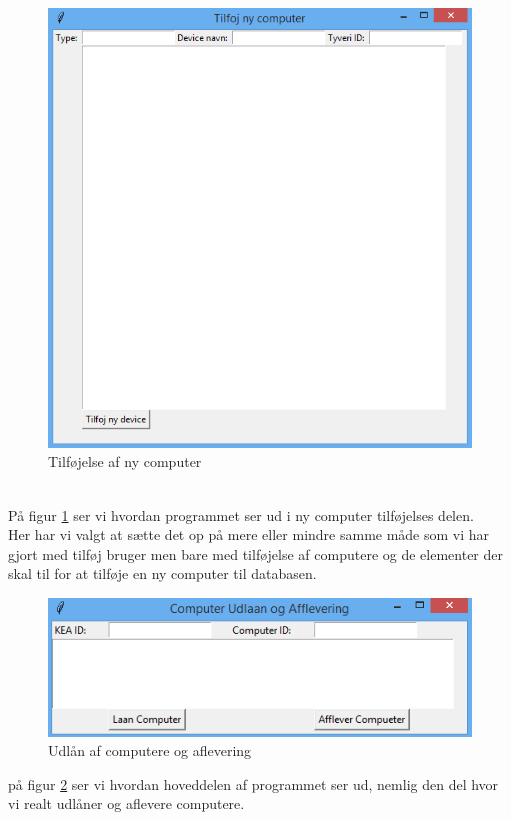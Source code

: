 \documentclass[a4paper]{article}
\begin{document}
\begin{figure}[h!]
\centering
\includegraphics[width=1\textwidth]{Tilfojcomputer.png}
\caption{Tilføjelse af ny computer}
\label{fig:GUI2}
\end{figure}
\\
På figur \ref{fig:GUI2} ser vi hvordan programmet ser ud i ny computer tilføjelses delen.\\
Her har vi valgt at sætte det op på mere eller mindre samme måde som vi har gjort med tilføj bruger men bare med tilføjelse af computere og de elementer der skal til for at tilføje en ny computer til databasen.
\pagebreak
\begin{figure}[h!]
\centering
\includegraphics[width=1\textwidth]{Udlan.png}
\caption{Udlån af computere og aflevering}
\label{fig:GUI3}
\end{figure}
på figur \ref{fig:GUI3} ser vi hvordan hoveddelen af programmet ser ud, nemlig den del hvor vi realt udlåner og aflevere computere.
\end{document}
